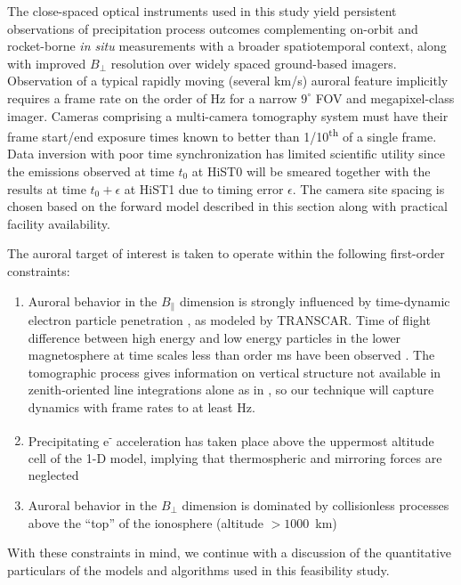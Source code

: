 The close-spaced optical instruments used in this study yield persistent observations of precipitation process outcomes \citep{tanaka2011,wedlund2013} complementing on-orbit and rocket-borne \textit{in situ} measurements with a broader spatiotemporal context, along with improved $B_\perp$ resolution over widely spaced ground-based imagers.
Observation of a typical rapidly moving (several km/s) auroral feature implicitly requires a frame rate on the order of \unit[100]{Hz} for a narrow $9^\circ$ FOV and megapixel-class imager. 
Cameras comprising a multi-camera tomography system must have their frame start/end exposure times known to better than 1/10\textsuperscript{th} of a single frame.
Data inversion with poor time synchronization has limited scientific utility since the emissions observed at time $t_0$ at HiST0 will be smeared together with the results at time $t_0+\epsilon$ at HiST1 due to timing error $\epsilon$.
The camera site spacing is chosen based on the forward model described in this section along with practical facility availability. 

The auroral target of interest is taken to operate within the following first-order constraints:
\begin{enumerate}
    \item Auroral behavior in the $B_\parallel$ dimension is strongly influenced by time-dynamic electron particle penetration \citep{lilensten2002}, as modeled by TRANSCAR. Time of flight difference between high energy and low energy particles in the lower magnetosphere at time scales less than order \unit[10]{ms} have been observed \citep{peticolas2000}. 
    The tomographic process gives information on vertical structure not available in zenith-oriented line integrations alone as in \citet{peticolas2000}, so our technique will capture dynamics with frame rates to at least \unit[100]{Hz}.
    \item Precipitating e\textsuperscript{-} acceleration has taken place above the uppermost altitude cell of the 1-D model, implying that thermospheric and mirroring forces are neglected \citep{lilensten2002,swift1975}
    \item Auroral behavior in the $B_\perp$ dimension is dominated by collisionless processes above the ``top'' of the ionosphere (altitude $>1000$~km) \citep{mozer1998,ergun2002}
\end{enumerate}
With these constraints in mind, we continue with a discussion of the quantitative particulars of the models and algorithms used in this feasibility study. 

